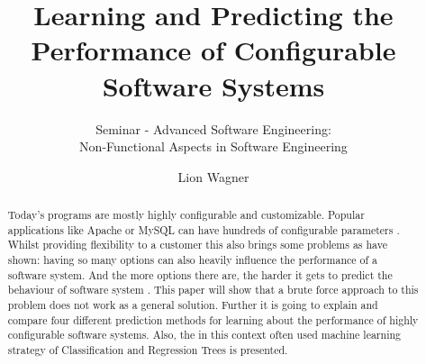 \documentclass[pdftex,english,oribibl]{llncs}
\title{Learning and Predicting the Performance of Configurable Software Systems}
\subtitle{Seminar - Advanced Software Engineering:\\
Non-Functional Aspects in Software Engineering}
\author{Lion Wagner}
\institute{University of Stuttgart\\Institute of Software Technology (ISTE)\\70569 Stuttgart, Germany}
\begin{document}
\maketitle
\begin{abstract}
  Today's programs are mostly highly configurable and customizable. Popular applications like Apache or MySQL can have hundreds of configurable parameters \cite{YouveGivenMeTooManyKnobs}. Whilst providing flexibility to a customer this also brings some problems as \citet{YouveGivenMeTooManyKnobs} have shown: having so many options can also heavily influence the performance of a software system. And the more options there are, the harder it gets to predict the behaviour of software system \cite{CostEfficientSampling_Gou_Siegmund_2015}. This paper will show that a brute force approach to this problem does not work as a general solution. Further it is going to explain and compare four different prediction methods for learning about the performance of highly configurable software systems. Also, the in this context often used machine learning strategy of Classification and Regression Trees is presented. 
\end{abstract}







%





\end{document}
